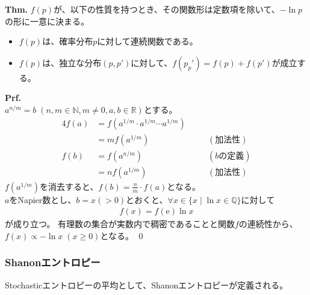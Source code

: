 \documentclass[a4paper,11pt]{jsarticle}
\numberwithin{equation}{section}
\begin{document}
\begin{itembox}[l]{\textbf{Thm.}}
    $f(p)$が、以下の性質を持つとき、その関数形は定数項を除いて、$-\ln p$の形に一意に決まる。
    \begin{itemize}
        \item $f(p)$は、確率分布$p$に対して連続関数である。
        \item $f(p)$は、独立な分布$(p,p')$に対して、$f(p_p') = f(p) + f(p')$が成立する。
    \end{itemize}
\end{itembox}
\textbf{Prf.}\\
\indent
$a^{n/m} = b \; (n, m \in \mathbb{N}, m \neq 0, a, b \in \mathbb{R})$とする。
\begin{alignat*}{4}
  f(a) &= f(a^{1/m} \cdot a^{1/m} \cdots a^{1/m}) \\
  &= m f(a^{1/m}) && \quad (\text{加法性}) \\
  f(b) &= f(a^{n/m}) && \quad (\text{$b$の定義}) \\
  &= n f(a^{1/m}) && \quad (\text{加法性})
\end{alignat*}
$f(a^{1/m})$を消去すると、$f(b)=\frac{n}{m} \cdot f(a)$となる。\\
$a$をNapier数とし、$b=x(>0)$とおくと、$\forall x \in \{ x \mid \ln{x} \in \mathbb{Q} \}$に対して
\begin{align}
  f(x) = f(\mathrm{e}) \ln{x}
\end{align}
が成り立つ。
有理数の集合が実数内で稠密であることと関数$f$の連続性から、\\
$f(x) \propto - \ln{x} \; (x \geq 0)$となる。
\qed\\

\subsubsection{Shanonエントロピー}
Stochasticエントロピーの平均として、Shanonエントロピーが定義される。
\end{document}
